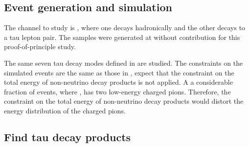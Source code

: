 



\subsection{Event generation and simulation}

The channel to study is \HepProcess{\Pep \Pem \to \PZ \PZ}, where one \PZ decays hadronically and the other \PZ decays to a tau lepton pair. The samples were generated at  without \ISR contribution for this proof-of-principle study.

The same seven tau decay modes defined in  are studied. The constraints on the simulated events are the same as those in , expect that the constraint on the total energy of non-neutrino decay products is not applied. A a considerable fraction of \ZToTauTau events, where \tauToPion, has two low-energy charged pions. Therefore, the constraint on the total energy of non-neutrino decay products would distort the energy distribution of the charged pions.


\subsection{Find tau decay products}
\label{sec:tauHZfindTau}

